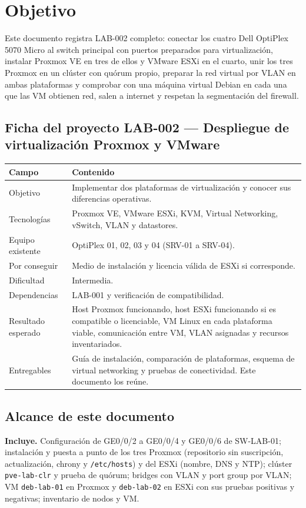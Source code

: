 \documentclass[11pt,a4paper]{article}
\newcommand{\cab}{\rowcolor{light}}
\begin{document}
\pagestyle{eicl}

\section{Objetivo}
Este documento registra LAB-002 completo: conectar los cuatro Dell OptiPlex 5070 Micro al switch principal con puertos preparados para virtualización, instalar Proxmox VE en tres de ellos y VMware ESXi en el cuarto, unir los tres Proxmox en un clúster con quórum propio, preparar la red virtual por VLAN en ambas plataformas y comprobar con una máquina virtual Debian en cada una que las VM obtienen red, salen a internet y respetan la segmentación del firewall.

\subsection*{Ficha del proyecto LAB-002 --- Despliegue de virtualización Proxmox y VMware}
\begin{tabularx}{\textwidth}{L{3.6cm} Z}
  \toprule
  \cab\textbf{Campo} & \textbf{Contenido}\\
  \midrule
  Objetivo & Implementar dos plataformas de virtualización y conocer sus diferencias operativas.\\
  Tecnologías & Proxmox VE, VMware ESXi, KVM, Virtual Networking, vSwitch, VLAN y datastores.\\
  Equipo existente & OptiPlex 01, 02, 03 y 04 (SRV-01 a SRV-04).\\
  Por conseguir & Medio de instalación y licencia válida de ESXi si corresponde.\\
  Dificultad & Intermedia.\\
  Dependencias & LAB-001 y verificación de compatibilidad.\\
  Resultado esperado & Host Proxmox funcionando, host ESXi funcionando si es compatible o licenciable, VM Linux en cada plataforma viable, comunicación entre VM, VLAN asignadas y recursos inventariados.\\
  Entregables & Guía de instalación, comparación de plataformas, esquema de virtual networking y pruebas de conectividad. Este documento los reúne.\\
  \bottomrule
\end{tabularx}

\subsection{Alcance de este documento}
\textbf{Incluye.} Configuración de GE0/0/2 a GE0/0/4 y GE0/0/6 de SW-LAB-01; instalación y puesta a punto de los tres Proxmox (repositorio sin suscripción, actualización, chrony y \texttt{/etc/hosts}) y del ESXi (nombre, DNS y NTP); clúster \texttt{pve-lab-clr} y prueba de quórum; bridges con VLAN y port group por VLAN; VM \texttt{deb-lab-01} en Proxmox y \texttt{deb-lab-02} en ESXi con sus pruebas positivas y negativas; inventario de nodos y VM.
\end{document}

